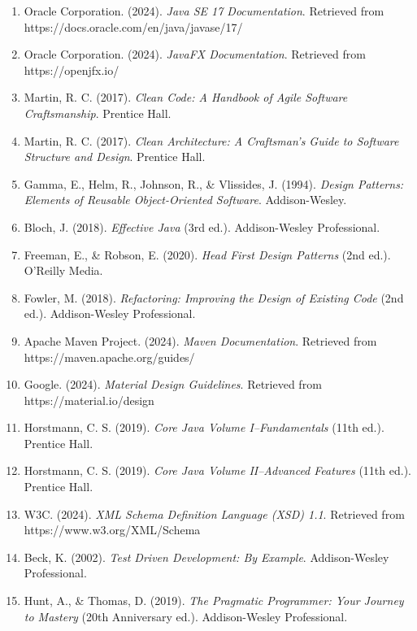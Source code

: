 \documentclass[12pt,a4paper]{article}
\begin{document}
\begin{enumerate}
    \item Oracle Corporation. (2024). \textit{Java SE 17 Documentation}. Retrieved from https://docs.oracle.com/en/java/javase/17/
    
    \item Oracle Corporation. (2024). \textit{JavaFX Documentation}. Retrieved from https://openjfx.io/
    
    \item Martin, R. C. (2017). \textit{Clean Code: A Handbook of Agile Software Craftsmanship}. Prentice Hall.
    
    \item Martin, R. C. (2017). \textit{Clean Architecture: A Craftsman's Guide to Software Structure and Design}. Prentice Hall.
    
    \item Gamma, E., Helm, R., Johnson, R., \& Vlissides, J. (1994). \textit{Design Patterns: Elements of Reusable Object-Oriented Software}. Addison-Wesley.
    
    \item Bloch, J. (2018). \textit{Effective Java} (3rd ed.). Addison-Wesley Professional.
    
    \item Freeman, E., \& Robson, E. (2020). \textit{Head First Design Patterns} (2nd ed.). O'Reilly Media.
    
    \item Fowler, M. (2018). \textit{Refactoring: Improving the Design of Existing Code} (2nd ed.). Addison-Wesley Professional.
    
    \item Apache Maven Project. (2024). \textit{Maven Documentation}. Retrieved from https://maven.apache.org/guides/
    
    \item Google. (2024). \textit{Material Design Guidelines}. Retrieved from https://material.io/design
    
    \item Horstmann, C. S. (2019). \textit{Core Java Volume I--Fundamentals} (11th ed.). Prentice Hall.
    
    \item Horstmann, C. S. (2019). \textit{Core Java Volume II--Advanced Features} (11th ed.). Prentice Hall.
    
    \item W3C. (2024). \textit{XML Schema Definition Language (XSD) 1.1}. Retrieved from https://www.w3.org/XML/Schema
    
    \item Beck, K. (2002). \textit{Test Driven Development: By Example}. Addison-Wesley Professional.
    
    \item Hunt, A., \& Thomas, D. (2019). \textit{The Pragmatic Programmer: Your Journey to Mastery} (20th Anniversary ed.). Addison-Wesley Professional.
\end{enumerate}
\end{document}
